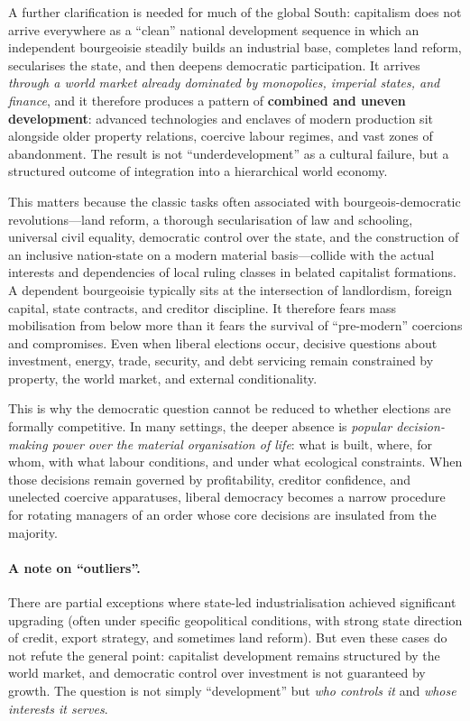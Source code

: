 A further clarification is needed for much of the global South: capitalism does not arrive everywhere as a
``clean'' national development sequence in which an independent bourgeoisie steadily builds an industrial
base, completes land reform, secularises the state, and then deepens democratic participation. It arrives
\emph{through a world market already dominated by monopolies, imperial states, and finance}, and it therefore
produces a pattern of \textbf{combined and uneven development}: advanced technologies and enclaves of modern
production sit alongside older property relations, coercive labour regimes, and vast zones of abandonment.\cite{TrotskyPermanentRevolution,RosenbergUCD}
The result is not ``underdevelopment'' as a cultural failure, but a structured outcome of integration into a
hierarchical world economy.\cite{LeninImperialism,PatnaikImperialism}

This matters because the classic tasks often associated with bourgeois-democratic revolutions---land reform,
a thorough secularisation of law and schooling, universal civil equality, democratic control over the state,
and the construction of an inclusive nation-state on a modern material basis---collide with the actual
interests and dependencies of local ruling classes in belated capitalist formations. A dependent bourgeoisie
typically sits at the intersection of landlordism, foreign capital, state contracts, and creditor discipline.
It therefore fears mass mobilisation from below more than it fears the survival of ``pre-modern'' coercions
and compromises. Even when liberal elections occur, decisive questions about investment, energy, trade,
security, and debt servicing remain constrained by property, the world market, and external conditionality.\cite{PeetUnholyTrinity,HarveyNeoliberalism}

This is why the democratic question cannot be reduced to whether elections are formally competitive. In many
settings, the deeper absence is \emph{popular decision-making power over the material organisation of life}:
what is built, where, for whom, with what labour conditions, and under what ecological constraints. When those
decisions remain governed by profitability, creditor confidence, and unelected coercive apparatuses, liberal
democracy becomes a narrow procedure for rotating managers of an order whose core decisions are insulated from
the majority.

\paragraph{A note on ``outliers''.}
There are partial exceptions where state-led industrialisation achieved significant upgrading (often under
specific geopolitical conditions, with strong state direction of credit, export strategy, and sometimes land
reform). But even these cases do not refute the general point: capitalist development remains structured by the
world market, and democratic control over investment is not guaranteed by growth. The question is not simply
``development'' but \emph{who controls it} and \emph{whose interests it serves}.

